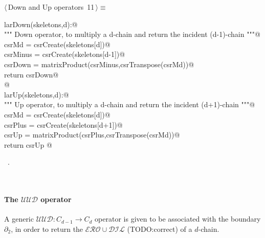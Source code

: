 \documentclass[11pt,oneside]{article}	%
\begin{document}
\begin{flushleft} \small
\begin{minipage}{\linewidth} \label{scrap17}
\protect{}$\langle\,$Down and Up operators\nobreak\ {\footnotesize 11}$\,\rangle\equiv$
\vspace{-1ex}
\begin{list}{}{} \item
\mbox{}\verb@def larDown(skeletons,d):@\\
\mbox{}\verb@   """ Down operator, to multiply a d-chain and return the incident (d-1)-chain """@\\
\mbox{}\verb@   csrMd = csrCreate(skeletons[d])@\\
\mbox{}\verb@   csrMinus = csrCreate(skeletons[d-1])@\\
\mbox{}\verb@   csrDown = matrixProduct(csrMinus,csrTranspose(csrMd))@\\
\mbox{}\verb@   return csrDown@\\
\mbox{}\verb@   @\\
\mbox{}\verb@def larUp(skeletons,d):@\\
\mbox{}\verb@   """ Up operator, to multiply a d-chain and return the incident (d+1)-chain """@\\
\mbox{}\verb@   csrMd = csrCreate(skeletons[d])@\\
\mbox{}\verb@   csrPlus = csrCreate(skeletons[d+1])@\\
\mbox{}\verb@   csrUp = matrixProduct(csrPlus,csrTranspose(csrMd))@\\
\mbox{}\verb@   return csrUp   @\\
\mbox{}\verb@@{\NWsep}
\end{list}
\vspace{-1ex}
\footnotesize\addtolength{\baselineskip}{-1ex}
\begin{list}{}{\setlength{\itemsep}{-\parsep}\setlength{\itemindent}{-\leftmargin}}
\item \NWtxtMacroRefIn\ .
\end{list}
\end{minipage}\\[4ex]
\end{flushleft}

\paragraph{The $\mathcal{UUD}$ operator}
A generic $\mathcal{UUD}: C_{d-1} \to C_{d}$ operator is given to be associated with the boundary $\partial_2$, in order to return the $\mathcal{ERO}\cup\mathcal{DIL}$ (TODO:correct) of a $d$-chain.
\end{document}
